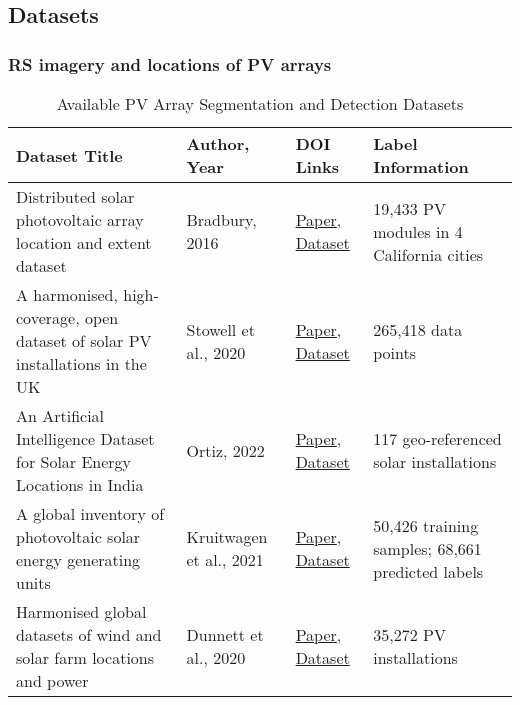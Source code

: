 \begin{multicols}{2}


\subsection{Datasets}
\subsubsection{RS imagery and locations of PV arrays}
    \begin{table}[htbp]
        \centering
        \scriptsize
        \caption{Available PV Array Segmentation and Detection Datasets}
        \begin{tabularx}{0.8\textwidth}{|l|l|X|l|}
            \hline
            \textbf{Dataset Title} & \textbf{Author, Year} & \textbf{DOI Links} & \textbf{Label Information} \\
            \hline
            Distributed solar photovoltaic array location and extent dataset & Bradbury, 2016 & \href{https://doi.org/10.1038/sdata.2016.106}{Paper}, \href{https://doi.org/10.6084/m9.figshare.3385780.v4}{Dataset} & 19,433 PV modules in 4 California cities \\
            \hline
            A harmonised, high-coverage, open dataset of solar PV installations in the UK & Stowell et al., 2020 & \href{https://doi.org/10.1038/s41597-020-00739-0}{Paper}, \href{https://zenodo.org/records/4059881}{Dataset} & 265,418 data points \\
            \hline
            An Artificial Intelligence Dataset for Solar Energy Locations in India & Ortiz, 2022 & \href{https://doi.org/10.1038/s41597-022-01499-9}{Paper}, \href{https://github.com/microsoft/solar-farms-mapping/blob/main/data/solar_farms_india_2021_merged_simplified.geojson}{Dataset} & 117 geo-referenced solar installations \\
            \hline
            A global inventory of photovoltaic solar energy generating units & Kruitwagen et al., 2021 & \href{https://doi.org/10.1038/s41586-021-03957-7}{Paper}, \href{https://doi.org/10.5281/zenodo.5005867}{Dataset} & 50,426 training samples; 68,661 predicted labels \\
            \hline
            Harmonised global datasets of wind and solar farm locations and power & Dunnett et al., 2020 & \href{https://doi.org/10.1038/s41597-020-0469-8}{Paper}, \href{https://doi.org/10.6084/m9.figshare.11310269.v6}{Dataset} & 35,272 PV installations \\

\end{tabularx}
\end{table}
\end{multicols}
